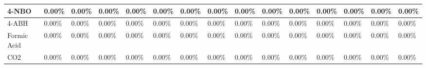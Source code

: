 \begin{landscape}
\begin{table}[H]
\begin{tabular}{|l|l|l|l|l|l|l|l|l|l|l|l|l|l|l|}
4-NBO                   & 0.00\%  & 0.00\%  & 0.00\%  & 0.00\%  & 0.00\%  & 0.00\%  & 0.00\%  & 0.00\%  & 0.00\%   & 0.00\%   & 0.00\%  & 0.00\%  & 0.00\%  & 0.00\%   \\ \hline
4-ABH                   & 0.00\%  & 0.00\%  & 0.00\%  & 0.00\%  & 0.00\%  & 0.00\%  & 0.00\%  & 0.00\%  & 0.00\%   & 0.00\%   & 0.00\%  & 0.00\%  & 0.00\%  & 0.00\%   \\ \hline
Formic Acid             & 0.00\%  & 0.00\%  & 0.00\%  & 0.00\%  & 0.00\%  & 0.00\%  & 0.00\%  & 0.00\%  & 0.00\%   & 0.00\%   & 0.00\%  & 0.00\%  & 0.00\%  & 0.00\%   \\ \hline
CO2                     & 0.00\%  & 0.00\%  & 0.00\%  & 0.00\%  & 0.00\%  & 0.00\%  & 0.00\%  & 0.00\%  & 0.00\%   & 0.00\%   & 0.00\%  & 0.00\%  & 0.00\%  & 0.00\%   \\ \hline
\end{tabular}
\end{table}





\end{landscape}
